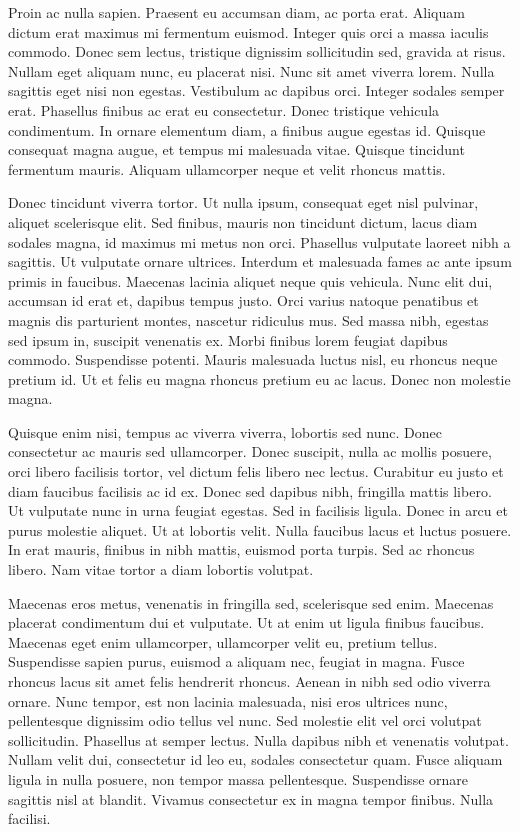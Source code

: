 \documentclass[
]{book}
\begin{document}
Proin ac nulla sapien. Praesent eu accumsan diam, ac porta erat. Aliquam dictum erat maximus mi fermentum euismod. Integer quis orci a massa iaculis commodo. Donec sem lectus, tristique dignissim sollicitudin sed, gravida at risus. Nullam eget aliquam nunc, eu placerat nisi. Nunc sit amet viverra lorem. Nulla sagittis eget nisi non egestas. Vestibulum ac dapibus orci. Integer sodales semper erat. Phasellus finibus ac erat eu consectetur. Donec tristique vehicula condimentum. In ornare elementum diam, a finibus augue egestas id. Quisque consequat magna augue, et tempus mi malesuada vitae. Quisque tincidunt fermentum mauris. Aliquam ullamcorper neque et velit rhoncus mattis.

Donec tincidunt viverra tortor. Ut nulla ipsum, consequat eget nisl pulvinar, aliquet scelerisque elit. Sed finibus, mauris non tincidunt dictum, lacus diam sodales magna, id maximus mi metus non orci. Phasellus vulputate laoreet nibh a sagittis. Ut vulputate ornare ultrices. Interdum et malesuada fames ac ante ipsum primis in faucibus. Maecenas lacinia aliquet neque quis vehicula. Nunc elit dui, accumsan id erat et, dapibus tempus justo. Orci varius natoque penatibus et magnis dis parturient montes, nascetur ridiculus mus. Sed massa nibh, egestas sed ipsum in, suscipit venenatis ex. Morbi finibus lorem feugiat dapibus commodo. Suspendisse potenti. Mauris malesuada luctus nisl, eu rhoncus neque pretium id. Ut et felis eu magna rhoncus pretium eu ac lacus. Donec non molestie magna.

Quisque enim nisi, tempus ac viverra viverra, lobortis sed nunc. Donec consectetur ac mauris sed ullamcorper. Donec suscipit, nulla ac mollis posuere, orci libero facilisis tortor, vel dictum felis libero nec lectus. Curabitur eu justo et diam faucibus facilisis ac id ex. Donec sed dapibus nibh, fringilla mattis libero. Ut vulputate nunc in urna feugiat egestas. Sed in facilisis ligula. Donec in arcu et purus molestie aliquet. Ut at lobortis velit. Nulla faucibus lacus et luctus posuere. In erat mauris, finibus in nibh mattis, euismod porta turpis. Sed ac rhoncus libero. Nam vitae tortor a diam lobortis volutpat.

Maecenas eros metus, venenatis in fringilla sed, scelerisque sed enim. Maecenas placerat condimentum dui et vulputate. Ut at enim ut ligula finibus faucibus. Maecenas eget enim ullamcorper, ullamcorper velit eu, pretium tellus. Suspendisse sapien purus, euismod a aliquam nec, feugiat in magna. Fusce rhoncus lacus sit amet felis hendrerit rhoncus. Aenean in nibh sed odio viverra ornare. Nunc tempor, est non lacinia malesuada, nisi eros ultrices nunc, pellentesque dignissim odio tellus vel nunc. Sed molestie elit vel orci volutpat sollicitudin. Phasellus at semper lectus. Nulla dapibus nibh et venenatis volutpat. Nullam velit dui, consectetur id leo eu, sodales consectetur quam. Fusce aliquam ligula in nulla posuere, non tempor massa pellentesque. Suspendisse ornare sagittis nisl at blandit. Vivamus consectetur ex in magna tempor finibus. Nulla facilisi.
\end{document}

